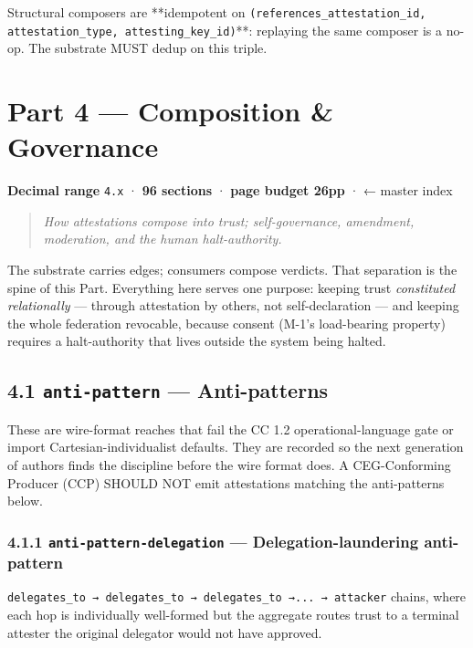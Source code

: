 \documentclass[11pt]{article}
\begin{document}
Structural composers are **idempotent on \texttt{(references\_attestation\_id, attestation\_type, attesting\_key\_id)}**: replaying the same composer is a no-op. The substrate MUST dedup on this triple.


\clearpage
\section*{Part 4 — Composition \& Governance}


\textbf{Decimal range} \texttt{4.x} · \textbf{96 sections} · \textbf{page budget 26pp} · ← master index


\begin{quote}\itshape How attestations compose into trust; self-governance, amendment, moderation, and the human halt-authority.\end{quote}


The substrate carries edges; consumers compose verdicts. That separation is the spine of this Part. Everything here serves one purpose: keeping trust \textit{constituted relationally} — through attestation by others, not self-declaration — and keeping the whole federation revocable, because consent (M-1's load-bearing property) requires a halt-authority that lives outside the system being halted.



\subsection*{4.1 \texttt{anti-pattern} — Anti-patterns}


These are wire-format reaches that fail the CC 1.2 operational-language gate or import Cartesian-individualist defaults. They are recorded so the next generation of authors finds the discipline before the wire format does. A CEG-Conforming Producer (CCP) SHOULD NOT emit attestations matching the anti-patterns below.


\subsubsection*{4.1.1 \texttt{anti-pattern-delegation} — Delegation-laundering anti-pattern}


\texttt{delegates\_to → delegates\_to → delegates\_to →... → attacker} chains, where each hop is individually well-formed but the aggregate routes trust to a terminal attester the original delegator would not have approved.
\end{document}
